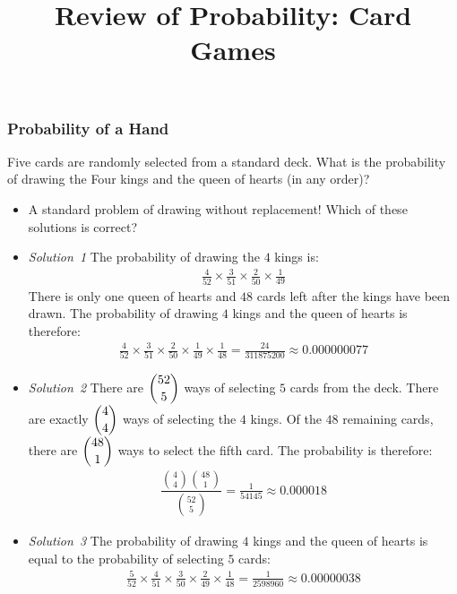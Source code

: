 \title[Probability]{Review of Probability: Card Games}
\date{}







\begin{frame}[allowframebreaks]%
\frametitle{Probability of a Hand}
\begin{emphbox}{}
Five cards are randomly selected from a standard deck. What is the probability of drawing the Four kings and the queen of hearts (in any order)? 
\end{emphbox}
\begin{itemize}
\item<2-> A standard problem of drawing without replacement! Which of these solutions is correct?
\item<3|only@3>\emph{Solution~1}
\dash The probability of drawing the $4$ kings is:
\begin{align*}
\frac{4}{52} \times \frac{3}{51} \times \frac{2}{50} \times \frac{1}{49} 
\end{align*}
\dash There is only one queen of hearts and $48$ cards left after the kings have been drawn. The probability of drawing $4$ kings and the queen of hearts is therefore:
\begin{align*}
\frac{4}{52} \times \frac{3}{51} \times \frac{2}{50} \times \frac{1}{49} \times \frac{1}{48} 
= \frac{24}{311875200}
\approx 0.000000077
\end{align*}

\item<4|only@4>\emph{Solution~2}
\dash There are $\dbinom{52}{5}$ ways of selecting $5$ cards from the deck.  
\dash There are exactly $\dbinom{4}{4}$ ways of selecting the $4$ kings. 
\dash Of the $48$ remaining cards, there are $\dbinom{48}{1}$ ways to select the fifth card. 
\dash The probability is therefore:
\begin{align*}
\dfrac{\binom{4}{4}\binom{48}{1}}{\binom{52}{5}} 
= \frac{1}{54145} 
\approx  0.000018
\end{align*}

\item<5|only@5>\emph{Solution~3}
\dash The probability of drawing $4$ kings and the queen of hearts is equal to the probability of selecting $5$ cards:
\begin{align*}
\frac{5}{52} \times \frac{4}{51} \times \frac{3}{50} \times \frac{2}{49} \times \frac{1}{48} 
= \frac{1}{2598960}
\approx 0.00000038
\end{align*}
\end{itemize}
\end{frame}


